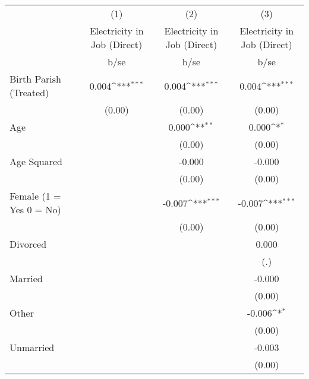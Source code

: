 {
\def\sym#1{\ifmmode^{#1}\else\(^{#1}\)\fi}
\begin{tabular}{l*{3}{c}}
\hline\hline
                    &\multicolumn{1}{c}{(1)}&\multicolumn{1}{c}{(2)}&\multicolumn{1}{c}{(3)}\\
                    &\multicolumn{1}{c}{Electricity in Job (Direct)}&\multicolumn{1}{c}{Electricity in Job (Direct)}&\multicolumn{1}{c}{Electricity in Job (Direct)}\\
                    &        b/se         &        b/se         &        b/se         \\
\hline
Birth Parish (Treated)&       0.004\sym{***}&       0.004\sym{***}&       0.004\sym{***}\\
                    &      (0.00)         &      (0.00)         &      (0.00)         \\
Age                 &                     &       0.000\sym{**} &       0.000\sym{*}  \\
                    &                     &      (0.00)         &      (0.00)         \\
Age Squared         &                     &      -0.000         &      -0.000         \\
                    &                     &      (0.00)         &      (0.00)         \\
Female (1 = Yes 0 = No)&                     &      -0.007\sym{***}&      -0.007\sym{***}\\
                    &                     &      (0.00)         &      (0.00)         \\
Divorced            &                     &                     &       0.000         \\
                    &                     &                     &         (.)         \\
Married             &                     &                     &      -0.000         \\
                    &                     &                     &      (0.00)         \\
Other               &                     &                     &      -0.006\sym{*}  \\
                    &                     &                     &      (0.00)         \\
Unmarried           &                     &                     &      -0.003         \\
                    &                     &                     &      (0.00)         \\

\end{tabular}}
